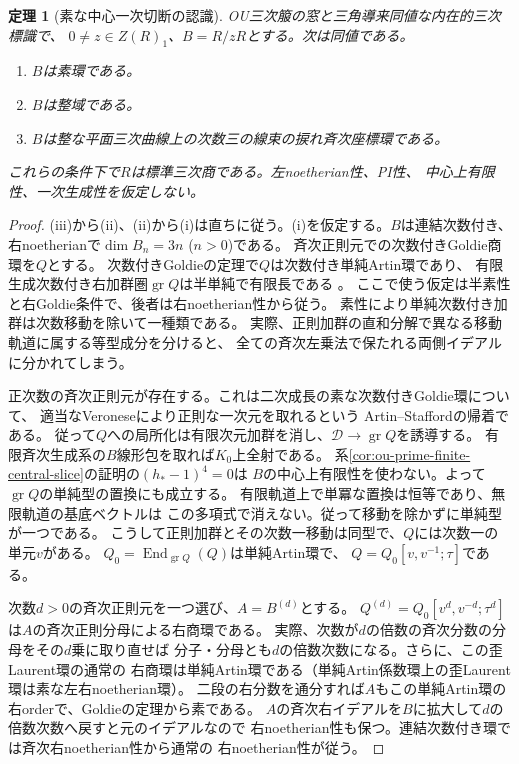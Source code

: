 \documentclass[11pt,a4paper]{ltjsarticle}
\newtheorem{theorem}{定理}[section]
\theoremstyle{definition}
\begin{document}
\begin{theorem}[素な中心一次切断の認識]
\label{thm:ou-prime-central-section}
OU三次箙の窓と三角導来同値な内在的三次標識で、
$0\ne z\in Z(R)_1$、$B=R/zR$とする。次は同値である。
\begin{enumerate}[label=(\roman*)]
\item $B$は素環である。
\item $B$は整域である。
\item $B$は整な平面三次曲線上の次数三の線束の捩れ斉次座標環である。
\end{enumerate}
これらの条件下で$R$は標準三次商である。左noetherian性、PI性、
中心上有限性、一次生成性を仮定しない。
\end{theorem}
\begin{proof}
(iii)から(ii)、(ii)から(i)は直ちに従う。(i)を仮定する。$B$は連結次数付き、
右noetherianで$\dim B_n=3n$ ($n>0$)である。
斉次正則元での次数付きGoldie商環を$Q$とする。
次数付きGoldieの定理で$Q$は次数付き単純Artin環であり、
有限生成次数付き右加群圏$\operatorname{gr}Q$は半単純で有限長である
\cite[Ch.~C, I.1.6]{NastasescuVanOystaeyen1982}。
ここで使う仮定は半素性と右Goldie条件で、後者は右noetherian性から従う。
素性により単純次数付き加群は次数移動を除いて一種類である。
実際、正則加群の直和分解で異なる移動軌道に属する等型成分を分けると、
全ての斉次左乗法で保たれる両側イデアルに分かれてしまう。

正次数の斉次正則元が存在する。これは二次成長の素な次数付きGoldie環について、
適当なVeroneseにより正則な一次元を取れるという
Artin--Staffordの帰着である\cite[\S6, Theorem~6.3の前]{StaffordVdB2001}。
従って$Q$への局所化は有限次元加群を消し、$\mathcal D\to\operatorname{gr}Q$を誘導する。
有限斉次生成系の$B$線形包を取れば$K_0$上全射である。
系\ref{cor:ou-prime-finite-central-slice}の証明の$(h_*-1)^4=0$は
$B$の中心上有限性を使わない。よって$\operatorname{gr}Q$の単純型の置換にも成立する。
有限軌道上で単冪な置換は恒等であり、無限軌道の基底ベクトルは
この多項式で消えない。従って移動を除かずに単純型が一つである。
こうして正則加群とその次数一移動は同型で、$Q$には次数一の単元$v$がある。
$Q_0=\operatorname{End}_{\operatorname{gr}Q}(Q)$は単純Artin環で、
$Q=Q_0[v,v^{-1};\tau]$である。

次数$d>0$の斉次正則元を一つ選び、$A=B^{(d)}$とする。
$Q^{(d)}=Q_0[v^d,v^{-d};\tau^d]$は$A$の斉次正則分母による右商環である。
実際、次数が$d$の倍数の斉次分数の分母をその$d$乗に取り直せば
分子・分母とも$d$の倍数次数になる。さらに、この歪Laurent環の通常の
右商環は単純Artin環である（単純Artin係数環上の歪Laurent環は素な左右noetherian環）。
二段の右分数を通分すれば$A$もこの単純Artin環の右orderで、Goldieの定理から素である。
$A$の斉次右イデアルを$B$に拡大して$d$の倍数次数へ戻すと元のイデアルなので
右noetherian性も保つ。連結次数付き環では斉次右noetherian性から通常の
右noetherian性が従う。


\end{proof}
\end{document}
